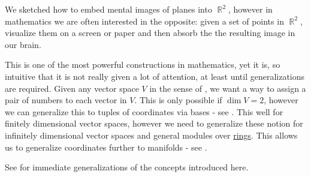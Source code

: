 \begin{remark}\label{rem:coordinate_systems}
  We sketched how to embed mental images of planes into \( \BbbR^2 \), however in mathematics we are often interested in the opposite: given a set of points in \( \BbbR^2 \), visualize them on a screen or paper and then absorb the the resulting image in our brain.

  This is one of the most powerful constructions in mathematics, yet it is, so intuitive that it is not really given a lot of attention, at least until generalizations are required. Given any vector space \( V \) in the sense of , we want a way to assign a pair of numbers to each vector in \( V \). This is only possible if \( \dim V = 2 \), however we can generalize this to tuples of coordinates via bases - see . This well for finitely dimensional vector spaces, however we need to generalize these notion for infinitely dimensional vector spaces and general modules over \hyperref[def:left_module]{rings}. This allows us to generalize coordinates further to manifolds - see .

  See  for immediate generalizations of the concepts introduced here.
\end{remark}
